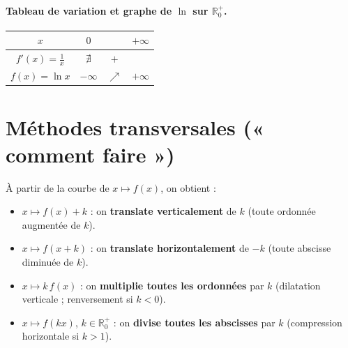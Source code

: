 \documentclass[11pt,a4paper]{article}
\newcommand{\R}{\mathbb{R}}
\newcommand{\croit}{\textcolor{varcol}{\Large$\nearrow$}}
\begin{document}
\paragraph{Tableau de variation et graphe de $\ln$ sur $\R_0^{+}$.}
\begin{center}
\renewcommand{\arraystretch}{1.6}\setlength{\tabcolsep}{14pt}
\begin{tabular}{|c|ccc|}
\hline
\rowcolor{primarylight}
$x$ & $0$ & & $+\infty$ \\
\hline
$f'(x)=\tfrac1x$ & $\nexists$ & $+$ & \\
\hline
$f(x)=\ln x$ & $-\infty$ & \croit & $+\infty$ \\
\hline
\end{tabular}
\qquad
{}
\end{center}

\section{Méthodes transversales (« comment faire »)}

\begin{methode}
À partir de la courbe de $x\mapsto f(x)$, on obtient :
\begin{itemize}[leftmargin=1.5em,topsep=2pt,itemsep=2pt]
  \item $x\mapsto f(x)+k$ : on \textbf{translate verticalement} de $k$ (toute ordonnée augmentée de $k$).
  \item $x\mapsto f(x+k)$ : on \textbf{translate horizontalement} de $-k$ (toute abscisse diminuée de $k$).
  \item $x\mapsto k\,f(x)$ : on \textbf{multiplie toutes les ordonnées} par $k$ (dilatation verticale ; renversement si $k<0$).
  \item $x\mapsto f(kx)$, $k\in\R_0^{+}$ : on \textbf{divise toutes les abscisses} par $k$ (compression horizontale si $k>1$).
\end{itemize}
\end{methode}
\end{document}
